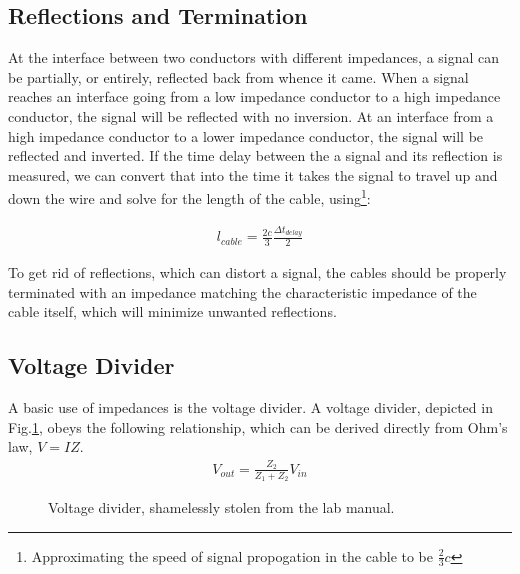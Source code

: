 \documentclass[12pt]{article}
\begin{document}
\subsection*{Reflections and Termination}
At the interface between two conductors with different impedances, a signal can be partially, or entirely, reflected back from whence it came. When a signal reaches an interface going from a low impedance conductor to a high impedance conductor, the signal will be reflected with no inversion. At an interface from a high impedance conductor to a lower impedance conductor, the signal will be reflected and inverted. If the time delay between the a signal and its reflection is measured, we can convert that into the time it takes the signal to travel up and down the wire and solve for the length of the cable, using\footnote{Approximating the speed of signal propogation in the cable to be $\frac{2}{3}c$}:

\begin{eqnarray}
l_{cable} = \frac{2c}{3} \frac{\Delta{t}_{delay}}{2} \label{eq:cablelength}
\end{eqnarray}

To get rid of reflections, which can distort a signal, the cables should be properly terminated with an impedance matching the characteristic impedance of the cable itself, which will minimize unwanted reflections.

\subsection*{Voltage Divider}
A basic use of impedances is the voltage divider. A voltage divider, depicted in Fig.\ref{fig:voltagedivider}, obeys the following relationship, which can be derived directly from Ohm's law, $V=IZ$.
\begin{eqnarray}
V_{out} = \frac{Z_2}{Z_1+Z_2} V_{in} \label{eq:voltagedivider}
\end{eqnarray}
\begin{figure}[H]
\caption{Voltage divider, shamelessly stolen from the lab manual.}
\label{fig:voltagedivider}
\end{figure}
\end{document}
